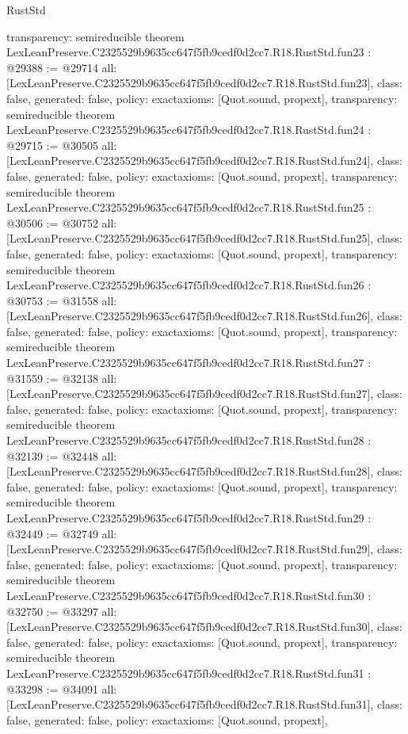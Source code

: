 \begin{lexlean}{RustStd}
\begin{coremodule}
{  transparency: semireducible
}
theorem LexLeanPreserve.C2325529b9635cc647f5fb9cedf0d2cc7.R18.RustStd.fun23 : @29388 := @29714 {
  all: [LexLeanPreserve.C2325529b9635cc647f5fb9cedf0d2cc7.R18.RustStd.fun23],
  class: false,
  generated: false,
  policy: exact{axioms: [Quot.sound, propext]},
  transparency: semireducible
}
theorem LexLeanPreserve.C2325529b9635cc647f5fb9cedf0d2cc7.R18.RustStd.fun24 : @29715 := @30505 {
  all: [LexLeanPreserve.C2325529b9635cc647f5fb9cedf0d2cc7.R18.RustStd.fun24],
  class: false,
  generated: false,
  policy: exact{axioms: [Quot.sound, propext]},
  transparency: semireducible
}
theorem LexLeanPreserve.C2325529b9635cc647f5fb9cedf0d2cc7.R18.RustStd.fun25 : @30506 := @30752 {
  all: [LexLeanPreserve.C2325529b9635cc647f5fb9cedf0d2cc7.R18.RustStd.fun25],
  class: false,
  generated: false,
  policy: exact{axioms: [Quot.sound, propext]},
  transparency: semireducible
}
theorem LexLeanPreserve.C2325529b9635cc647f5fb9cedf0d2cc7.R18.RustStd.fun26 : @30753 := @31558 {
  all: [LexLeanPreserve.C2325529b9635cc647f5fb9cedf0d2cc7.R18.RustStd.fun26],
  class: false,
  generated: false,
  policy: exact{axioms: [Quot.sound, propext]},
  transparency: semireducible
}
theorem LexLeanPreserve.C2325529b9635cc647f5fb9cedf0d2cc7.R18.RustStd.fun27 : @31559 := @32138 {
  all: [LexLeanPreserve.C2325529b9635cc647f5fb9cedf0d2cc7.R18.RustStd.fun27],
  class: false,
  generated: false,
  policy: exact{axioms: [Quot.sound, propext]},
  transparency: semireducible
}
theorem LexLeanPreserve.C2325529b9635cc647f5fb9cedf0d2cc7.R18.RustStd.fun28 : @32139 := @32448 {
  all: [LexLeanPreserve.C2325529b9635cc647f5fb9cedf0d2cc7.R18.RustStd.fun28],
  class: false,
  generated: false,
  policy: exact{axioms: [Quot.sound, propext]},
  transparency: semireducible
}
theorem LexLeanPreserve.C2325529b9635cc647f5fb9cedf0d2cc7.R18.RustStd.fun29 : @32449 := @32749 {
  all: [LexLeanPreserve.C2325529b9635cc647f5fb9cedf0d2cc7.R18.RustStd.fun29],
  class: false,
  generated: false,
  policy: exact{axioms: [Quot.sound, propext]},
  transparency: semireducible
}
theorem LexLeanPreserve.C2325529b9635cc647f5fb9cedf0d2cc7.R18.RustStd.fun30 : @32750 := @33297 {
  all: [LexLeanPreserve.C2325529b9635cc647f5fb9cedf0d2cc7.R18.RustStd.fun30],
  class: false,
  generated: false,
  policy: exact{axioms: [Quot.sound, propext]},
  transparency: semireducible
}
theorem LexLeanPreserve.C2325529b9635cc647f5fb9cedf0d2cc7.R18.RustStd.fun31 : @33298 := @34091 {
  all: [LexLeanPreserve.C2325529b9635cc647f5fb9cedf0d2cc7.R18.RustStd.fun31],
  class: false,
  generated: false,
  policy: exact{axioms: [Quot.sound, propext]},
}
\end{coremodule}
\end{lexlean}

